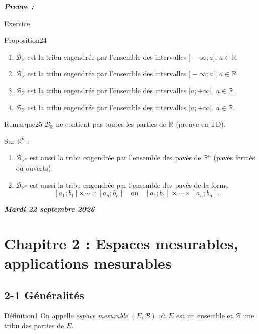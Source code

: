 \documentclass[11pt,a4paper]{article}
\newcommand{\R}{\mathbb{R}}
\newcommand{\B}{\mathscr{B}}
\newenvironment{preuve}{\par\textit{\textbf{Preuve :}}\par\nopagebreak[4]}{\par}
\newcommand{\datepage}[1]{\begin{flushright}\small\bfseries\itshape\color{bleuclair}#1\end{flushright}\vspace{-8pt}}
\begin{document}
\begin{preuve}\end{preuve}
Exercice.

\begin{enonce}{Proposition}{24}
\begin{enumerate}[label=\textbf{\arabic*)},leftmargin=1.2cm]
  \item $\B_{\R}$ est la tribu engendrée par l'ensemble des intervalles $]-\infty;a]$, $a\in\R$.
  \item $\B_{\R}$ est la tribu engendrée par l'ensemble des intervalles $]-\infty;a[$, $a\in\R$.
  \item $\B_{\R}$ est la tribu engendrée par l'ensemble des intervalles $[a;+\infty[$, $a\in\R$.
  \item $\B_{\R}$ est la tribu engendrée par l'ensemble des intervalles $]a;+\infty[$, $a\in\R$.
\end{enumerate}
\end{enonce}



\begin{enonce}{Remarque}{25}
$\B_{\R}$ ne contient pas toutes les parties de $\R$ (preuve en TD).
\end{enonce}

Sur $\R^n$ :
\begin{enumerate}[label=\textbf{\arabic*)},leftmargin=1.2cm]
  \item $\B_{\R^n}$ est aussi la tribu engendrée par l'ensemble des pavés de $\R^n$ (pavés fermés ou ouverts).
  \item $\B_{\R^n}$ est aussi la tribu engendrée par l'ensemble des pavés de la forme
        \[
          [a_1;b_1[\times\cdots\times[a_n;b_n[\quad\text{ou}\quad ]a_1;b_1]\times\cdots\times]a_n;b_n].
        \]
\end{enumerate}

\newpage
\datepage{Mardi 22 septembre 2026}
\section*{Chapitre 2 : Espaces mesurables, applications mesurables}
\subsection*{2-1 Généralités}

\begin{enonce}{Définition}{1}
On appelle \emph{espace mesurable} $(E,\B)$ où $E$ est un ensemble et $\B$ une tribu des parties de $E$.
\end{enonce}
\end{document}
